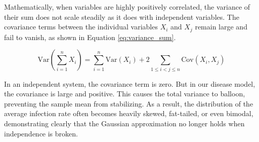 \documentclass{article}
\begin{document}
Mathematically, when variables are highly positively correlated, the variance of their sum does not scale steadily as it does with independent variables. The covariance terms between the individual variables $X_i$ and $X_j$ remain large and fail to vanish, as shown in Equation \ref{eq:variance_sum}.

\begin{equation} \label{eq:variance_sum}
    \text{Var}\left(\sum_{i=1}^{n} X_i\right) = \sum_{i=1}^{n} \text{Var}(X_i) + 2 \sum_{1 \le i < j \le n} \text{Cov}(X_i, X_j)
\end{equation}

In an independent system, the covariance term is zero. But in our disease model, the covariance is large and positive. This causes the total variance to balloon, preventing the sample mean from stabilizing. As a result, the distribution of the average infection rate often becomes heavily skewed, fat-tailed, or even bimodal, demonstrating clearly that the Gaussian approximation no longer holds when independence is broken.


\newpage



\end{document}
